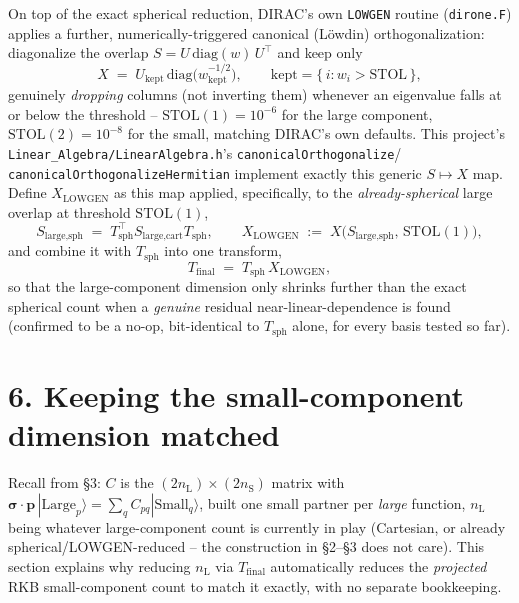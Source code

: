 \documentclass[11pt]{article}
\newcommand{\bs}[1]{\boldsymbol{#1}}
\begin{document}
On top of the exact spherical reduction, DIRAC's own \texttt{LOWGEN} routine (\texttt{dirone.F})
applies a further, numerically-triggered canonical (Löwdin) orthogonalization: diagonalize the
overlap $S=U\,\mathrm{diag}(w)\,U^{\!\top}$ and keep only
\begin{equation}
X \;=\; U_{\text{kept}}\,\mathrm{diag}\big(w_{\text{kept}}^{-1/2}\big),
\qquad \text{kept} = \{\,i : w_i > \text{STOL}\,\},
\end{equation}
genuinely \emph{dropping} columns (not inverting them) whenever an eigenvalue falls at or below the
threshold -- $\text{STOL}(1)=10^{-6}$ for the large component, $\text{STOL}(2)=10^{-8}$ for the
small, matching DIRAC's own defaults. This project's
\texttt{Linear\_Algebra/LinearAlgebra.h}'s \texttt{canonicalOrthogonalize}/
\texttt{canonicalOrthogonalizeHermitian} implement exactly this generic $S\mapsto X$ map. Define
$X_{\text{LOWGEN}}$ as this map applied, specifically, to the \emph{already-spherical} large overlap
at threshold $\text{STOL}(1)$,
\begin{equation}
S_{\text{large,sph}} \;=\; T_{\text{sph}}^{\!\top}S_{\text{large,cart}}T_{\text{sph}},
\qquad
X_{\text{LOWGEN}} \;:=\; X\big(S_{\text{large,sph}},\,\text{STOL}(1)\big),
\end{equation}
and combine it with $T_{\text{sph}}$ into one transform,
\begin{equation}
T_{\text{final}} \;=\; T_{\text{sph}}\,X_{\text{LOWGEN}},
\end{equation}
so that the large-component dimension only shrinks further than the exact spherical count when a
\emph{genuine} residual near-linear-dependence is found (confirmed to be a no-op, bit-identical to
$T_{\text{sph}}$ alone, for every basis tested so far).

\section*{6. Keeping the small-component dimension matched}

Recall from \S3: $C$ is the $(2n_{\text{L}})\times(2n_{\text{S}})$ matrix with
$\bs\sigma\!\cdot\!\bs p\,|\text{Large}_p\rangle = \sum_q C_{pq}|\text{Small}_q\rangle$, built one
small partner per \emph{large} function, $n_{\text{L}}$ being whatever large-component count is
currently in play (Cartesian, or already spherical/LOWGEN-reduced -- the construction in \S2--\S3
does not care). This section explains why reducing $n_{\text{L}}$ via $T_{\text{final}}$
automatically reduces the \emph{projected} RKB small-component count to match it exactly, with no
separate bookkeeping.
\end{document}
